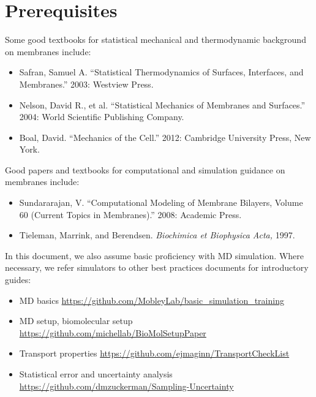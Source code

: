 \documentclass[9pt,bestpractices]{livecoms}
\begin{document}
\section{Prerequisites}
\label{sec:prereq}
Some good textbooks for statistical mechanical and thermodynamic background on membranes include:

\begin{itemize}
	\item Safran, Samuel A. ``Statistical Thermodynamics of Surfaces, Interfaces, and Membranes.'' 2003: Westview Press.
	\item Nelson, David R., et al. ``Statistical Mechanics of Membranes and Surfaces.'' 2004: World Scientific Publishing Company.
	\item Boal, David. ``Mechanics of the Cell.'' 2012: Cambridge University Press, New York.
\end{itemize}

Good papers and textbooks for computational and simulation guidance on membranes include:

\begin{itemize}
	\item Sundararajan, V. ``Computational Modeling of Membrane Bilayers, Volume 60 (Current Topics in Membranes).'' 2008: Academic Press.
	\item Tieleman, Marrink, and Berendsen. \textit{Biochimica et Biophysica Acta,} 1997.
\end{itemize}

In this document, we also assume basic proficiency with MD simulation. Where necessary, we refer simulators to other best practices documents for introductory guides:

\parbox{8.5cm}{\sloppy
\begin{itemize}
\item MD basics \url{https://github.com/MobleyLab/basic_simulation_training}
\item MD setup, biomolecular setup \url{https://github.com/michellab/BioMolSetupPaper}
\item Transport properties \url{https://github.com/ejmaginn/TransportCheckList}
\item Statistical error and uncertainty analysis \url{https://github.com/dmzuckerman/Sampling-Uncertainty}
\end{itemize}}
\end{document}

